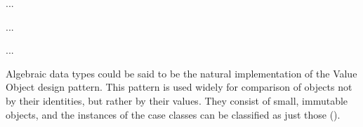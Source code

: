 {
  \small
  
}
...

{
  \small
  
}
...

{
  \small
  
}
...

Algebraic data types could be said to be the natural implementation of the
Value Object design pattern. This pattern is used widely for comparison of
objects not by their identities, but rather by their values. They consist of
small, immutable objects, and the instances of the case classes can be
classified as just those (\cite[][Ch.~8,~Location~3068]{nikolov2016scala}).
